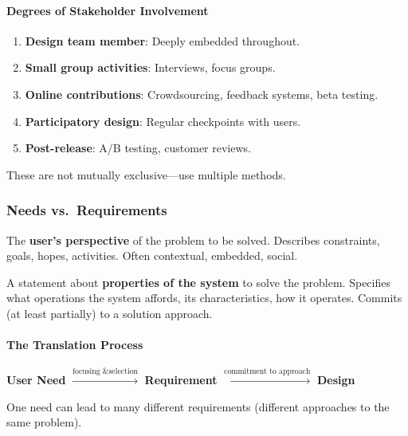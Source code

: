 \paragraph*{Degrees of Stakeholder Involvement}

\begin{enumerate}
  \item \textbf{Design team member}: Deeply embedded throughout.
  \item \textbf{Small group activities}: Interviews, focus groups.
  \item \textbf{Online contributions}: Crowdsourcing, feedback systems, beta testing.
  \item \textbf{Participatory design}: Regular checkpoints with users.
  \item \textbf{Post-release}: A/B testing, customer reviews.
\end{enumerate}

These are not mutually exclusive---use multiple methods.

\subsubsection*{Needs vs.\ Requirements}

\begin{defbox}
The \textbf{user's perspective} of the problem to be solved. Describes constraints, goals, hopes, activities. Often contextual, embedded, social.
\end{defbox}

\begin{defbox}
A statement about \textbf{properties of the system} to solve the problem. Specifies what operations the system affords, its characteristics, how it operates. Commits (at least partially) to a solution approach.
\end{defbox}

\paragraph*{The Translation Process}
\begin{center}
\textbf{User Need} $\xrightarrow{\text{focusing \& selection}}$ \textbf{Requirement} $\xrightarrow{\text{commitment to approach}}$ \textbf{Design}
\end{center}

One need can lead to many different requirements (different approaches to the same problem).

